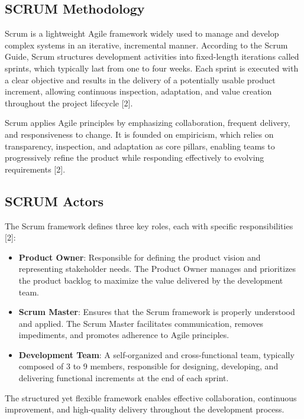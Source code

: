\subsection{SCRUM Methodology}

Scrum is a lightweight Agile framework widely used to manage and develop complex systems in an iterative, incremental manner. According to the Scrum Guide, Scrum structures development activities into fixed-length iterations called sprints, which typically last from one to four weeks. Each sprint is executed with a clear objective and results in the delivery of a potentially usable product increment, allowing continuous inspection, adaptation, and value creation throughout the project lifecycle [2].

Scrum applies Agile principles by emphasizing collaboration, frequent delivery, and responsiveness to change. It is founded on empiricism, which relies on transparency, inspection, and adaptation as core pillars, enabling teams to progressively refine the product while responding effectively to evolving requirements [2].

\subsection{SCRUM Actors}

The Scrum framework defines three key roles, each with specific responsibilities [2]:

\begin{itemize}[label={-}]
    \item \textbf{Product Owner}: Responsible for defining the product vision and representing stakeholder needs. The Product Owner manages and prioritizes the product backlog to maximize the value delivered by the development team.
    \item \textbf{Scrum Master}: Ensures that the Scrum framework is properly understood and applied. The Scrum Master facilitates communication, removes impediments, and promotes adherence to Agile principles.
    \item \textbf{Development Team}: A self-organized and cross-functional team, typically composed of 3 to 9 members, responsible for designing, developing, and delivering functional increments at the end of each sprint.
\end{itemize}

The structured yet flexible framework enables effective collaboration, continuous improvement, and high-quality delivery throughout the development process.

